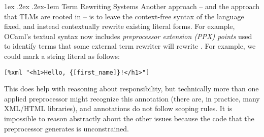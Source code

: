 \documentclass[acmsmall,screen]{acmart}
\makeatletter
\renewcommand{\paragraph}{%
  \@startsection{paragraph}{4}%
  {\z@}{1ex \@plus .2ex \@minus .2ex}{-1em}%
  {\normalfont\normalsize\bfseries}%
}
\newcommand{\li}[1]{\lstinline[basicstyle=\ttfamily\fontsize{9pt}{1em}\selectfont]{#1}}
\makeatother
\begin{document}

\paragraph{Term Rewriting Systems}
Another approach -- and the approach that TLMs are rooted in -- is to leave the context-free syntax of the language fixed, and instead contextually rewrite existing literal forms. For example, OCaml's textual syntax now includes \emph{preprocessor extension (PPX) points} used to identify terms that some external term rewriter will rewrite \cite{ocaml-manual}. For example, we could  mark a string literal as follows:
\begin{lstlisting}[numbers=none]
    [%xml "<h1>Hello, {[first_name]}!</h1>"]
\end{lstlisting}
This does help with reasoning about responsibility, but technically more than one applied preprocessor might recognize this annotation (there are, in practice, many XML/HTML libraries), and annotations do not follow scoping rules. It is impossible to reason abstractly about the other issues because the code that the preprocessor generates is unconstrained.%
\end{document}
